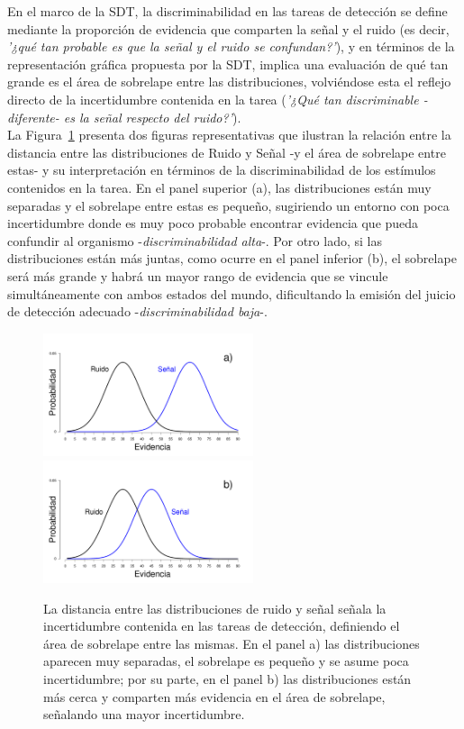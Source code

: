 En el marco de la SDT, la discriminabilidad en las tareas de detección se define mediante la proporción de evidencia que comparten la señal y el ruido (es decir, \textit{'¿qué tan probable es que la señal y el ruido se confundan?'}), y en términos de la representación gráfica propuesta por la SDT, implica una evaluación de qué tan grande es el área de sobrelape entre las distribuciones, volviéndose esta el reflejo directo de la incertidumbre contenida en la tarea (\textit{'¿Qué tan discriminable -diferente- es la señal respecto del ruido?'}).\\

La Figura~\ref{fig:Overlap} presenta dos figuras representativas que ilustran la relación entre la distancia entre las distribuciones de Ruido y Señal -y el área de sobrelape entre estas- y su interpretación en términos de la discriminabilidad de los estímulos contenidos en la tarea. En el panel superior (a), las distribuciones están muy separadas y el sobrelape entre estas es pequeño, sugiriendo un entorno con poca incertidumbre donde es muy poco probable encontrar evidencia que pueda confundir al organismo -\textit{discriminabilidad alta}-. Por otro lado, si las distribuciones están más juntas, como ocurre en el panel inferior (b), el sobrelape será más grande y habrá un mayor rango de evidencia que se vincule simultáneamente con ambos estados del mundo, dificultando la emisión del juicio de detección adecuado -\textit{discriminabilidad baja}-.\\

\begin{figure}[th]
\centering
\includegraphics[width=0.55\textwidth]{Figures/Overlap_Small}\\ 
\includegraphics[width=0.55\textwidth]{Figures/Overlap_Big} 
\caption[El sobrelape Ruido-señal como reflejo de la incertidumbre contenida en tareas de detección]{La distancia entre las distribuciones de ruido y señal señala la incertidumbre contenida en las tareas de detección, definiendo el área de sobrelape entre las mismas. En el panel a) las distribuciones aparecen muy separadas, el sobrelape es pequeño y se asume poca incertidumbre; por su parte, en el panel b) las distribuciones están más cerca y comparten más evidencia en el área de sobrelape, señalando una mayor incertidumbre.}
\label{fig:Overlap}
\end{figure}

